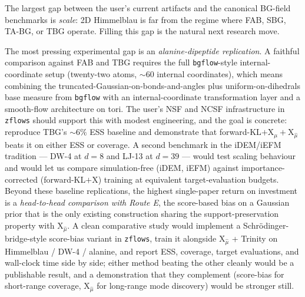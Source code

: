 \documentclass[11pt,letterpaper]{article}
\newcommand{\Xfun}{\mathrm{X}}
\theoremstyle{plain}
\begin{document}
The largest gap between the user's current artifacts and the canonical BG-field
benchmarks is \emph{scale}: 2D Himmelblau is far from the regime where FAB, SBG,
TA-BG, or TBG operate. Filling this gap is the natural next research move.

The most pressing experimental gap is an \emph{alanine-dipeptide replication}.
A faithful comparison against FAB and TBG requires the full
\texttt{bgflow}-style internal-coordinate setup (twenty-two atoms,
${\sim}60$ internal coordinates), which means combining the
truncated-Gaussian-on-bonds-and-angles plus uniform-on-dihedrals base
measure from \texttt{bgflow} with an internal-coordinate transformation
layer and a smooth-flow architecture on tori. The user's NSF and NCSF
infrastructure in \texttt{zflows} should support this with modest
engineering, and the goal is concrete: reproduce TBG's ${\sim}6\%$ ESS
baseline and demonstrate that forward-KL$+\Xfun_\mu+\Xfun_{\hat\mu}$
beats it on either ESS or coverage. A second benchmark in the iDEM/iEFM
tradition --- DW-4 at $d=8$ and LJ-13 at $d=39$ --- would test scaling
behaviour and would let us compare simulation-free (iDEM, iEFM) against
importance-corrected (forward-KL$+\Xfun$) training at equivalent
target-evaluation budgets. Beyond these baseline replications, the highest
single-paper return on investment is a \emph{head-to-head comparison with
Route E}, the score-based bias on a Gaussian prior that is the only existing
construction sharing the support-preservation property with $\Xfun_{\hat\mu}$.
A clean comparative study would implement a Schrödinger-bridge-style
score-bias variant in \texttt{zflows}, train it alongside $\Xfun_{\hat\mu}$
+ Trinity on Himmelblau / DW-4 / alanine, and report ESS, coverage, target
evaluations, and wall-clock time side by side; either method beating the
other cleanly would be a publishable result, and a demonstration that they
complement (score-bias for short-range coverage, $\Xfun_{\hat\mu}$ for
long-range mode discovery) would be stronger still.
\end{document}
